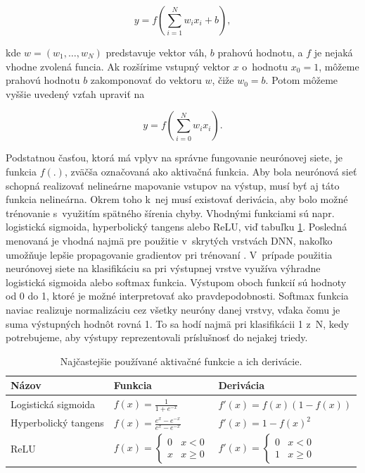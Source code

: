 \begin{equation}
    y = f\left(\sum_{i=1}^N{w_i x_i} + b\right),
\end{equation}

\noindent kde $w = (w_1, \dots, w_N)$ predstavuje vektor váh, $b$ prahovú hodnotu, a $f$ je nejaká vhodne zvolená funcia. Ak rozšírime vstupný vektor $x$ o~hodnotu $x_0 = 1$, môžeme prahovú hodnotu $b$ zakomponovať do vektoru $w$, čiže $w_0 = b$. Potom môžeme vyššie uvedený vzťah upraviť na

\begin{equation}
    y = f\left(\sum_{i=0}^N{w_i x_i}\right).
\end{equation}

\noindent Podstatnou časťou, ktorá má vplyv na správne fungovanie neurónovej siete, je funkcia $f(.)$, zväčša označovaná ako aktivačná funkcia. Aby bola neurónová sieť schopná realizovať nelineárne mapovanie vstupov na výstup, musí byť aj táto funkcia nelineárna. Okrem toho k~nej musí existovať derivácia, aby bolo možné trénovanie s~využitím spätného šírenia chyby. Vhodnými funkciami sú napr. logistická sigmoida, hyperbolický tangens alebo ReLU, viď tabuľku \ref{tab:activation-functions}. Posledná menovaná je vhodná najmä pre použitie v~skrytých vrstvách DNN, nakoľko umožňuje lepšie propagovanie gradientov pri trénovaní \cite{Glorot2011}. V~prípade použitia neurónovej siete na klasifikáciu sa pri výstupnej vrstve využíva výhradne logistická sigmoida alebo softmax funkcia. Výstupom oboch funkcií sú hodnoty od 0 do 1, ktoré je možné interpretovať ako pravdepodobnosti. Softmax funkcia naviac realizuje normalizáciu cez všetky neuróny danej vrstvy, vďaka čomu je suma výstupných hodnôt rovná 1. To sa hodí najmä pri klasifikácii 1 z~N, kedy potrebujeme, aby výstupy reprezentovali príslušnosť do nejakej triedy. 

\begin{table}[ht!]
    \centering
    \begingroup
    \begin{tabular}{@{}lll@{}}
    \toprule
    Názov                & Funkcia & Derivácia\\ \midrule
    Logistická sigmoida  & $\displaystyle f(x) = \frac{1}{1+e^{-x}}$ &  $\displaystyle f'(x) = f(x)(1-f(x))$    \\
    Hyperbolický tangens & \rule{0pt}{0.8cm}$\displaystyle f(x) = \frac{e^x - e^{-x}}{e^x - e^{-x}}$  & $\displaystyle f'(x) = 1 - f(x)^2$   \\
    ReLU                 & \rule{0pt}{0.8cm}$\displaystyle f(x) = \begin{cases} 0 & x < 0 \\ x & x \geq 0 \end{cases}$  & $\displaystyle f'(x) = \begin{cases} 0 & x < 0 \\ 1 & x \geq 0 \end{cases}$   \\ \bottomrule
    \end{tabular}
    \endgroup
    \caption{Najčastejšie používané aktivačné funkcie a ich derivácie.} \label{tab:activation-functions}
\end{table}

